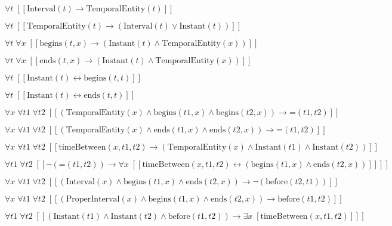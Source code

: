 \documentclass{article}
\begin{document}
$\forall t\;  \left[ \left[ \textrm{Interval}(t) \rightarrow \textrm{TemporalEntity}(t) \right] \right]$

$\forall t\;  \left[ \left[ \textrm{TemporalEntity}(t) \rightarrow \left(\textrm{Interval}(t) \lor \textrm{Instant}(t)\right) \right] \right]$

$\forall t\; \forall x\;  \left[ \left[ \textrm{begins}(t,x) \rightarrow \left(\textrm{Instant}(t) \land \textrm{TemporalEntity}(x)\right) \right] \right]$

$\forall t\; \forall x\;  \left[ \left[ \textrm{ends}(t,x) \rightarrow \left(\textrm{Instant}(t) \land \textrm{TemporalEntity}(x)\right) \right] \right]$

$\forall t\;  \left[ \left[ \textrm{Instant}(t) \leftrightarrow \textrm{begins}(t,t) \right] \right]$

$\forall t\;  \left[ \left[ \textrm{Instant}(t) \leftrightarrow \textrm{ends}(t,t) \right] \right]$

$\forall x\; \forall t1\; \forall t2\;  \left[ \left[ \left(\textrm{TemporalEntity}(x) \land \textrm{begins}(t1,x) \land \textrm{begins}(t2,x)\right) \rightarrow \textrm{=}(t1,t2) \right] \right]$

$\forall x\; \forall t1\; \forall t2\;  \left[ \left[ \left(\textrm{TemporalEntity}(x) \land \textrm{ends}(t1,x) \land \textrm{ends}(t2,x)\right) \rightarrow \textrm{=}(t1,t2) \right] \right]$

$\forall x\; \forall t1\; \forall t2\;  \left[ \left[ \textrm{timeBetween}(x,t1,t2) \rightarrow \left(\textrm{TemporalEntity}(x) \land \textrm{Instant}(t1) \land \textrm{Instant}(t2)\right) \right] \right]$

$\forall t1\; \forall t2\;  \left[ \left[ \neg \left(\textrm{=}(t1,t2)\right) \rightarrow \forall x\;  \left[ \left[ \textrm{timeBetween}(x,t1,t2) \leftrightarrow \left(\textrm{begins}(t1,x) \land \textrm{ends}(t2,x)\right) \right] \right] \right] \right]$

$\forall x\; \forall t1\; \forall t2\;  \left[ \left[ \left(\textrm{Interval}(x) \land \textrm{begins}(t1,x) \land \textrm{ends}(t2,x)\right) \rightarrow \neg \left(\textrm{before}(t2,t1)\right) \right] \right]$

$\forall x\; \forall t1\; \forall t2\;  \left[ \left[ \left(\textrm{ProperInterval}(x) \land \textrm{begins}(t1,x) \land \textrm{ends}(t2,x)\right) \rightarrow \textrm{before}(t1,t2) \right] \right]$

$\forall t1\; \forall t2\;  \left[ \left[ \left(\textrm{Instant}(t1) \land \textrm{Instant}(t2) \land \textrm{before}(t1,t2)\right) \rightarrow \exists x\;  \left[ \textrm{timeBetween}(x,t1,t2) \right] \right] \right]$
\end{document}
